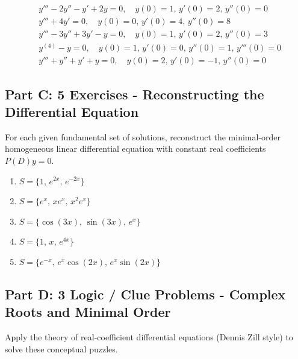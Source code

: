 \documentclass[11pt,letterpaper]{article}
\begin{document}
\begin{align}
    & y''' - 2y'' - y' + 2y = 0, \quad y(0) = 1, \, y'(0) = 2, \, y''(0) = 0 \label{eq:ivp_1} \\
    & y''' + 4y' = 0, \quad y(0) = 0, \, y'(0) = 4, \, y''(0) = 8 \label{eq:ivp_2} \\
    & y''' - 3y'' + 3y' - y = 0, \quad y(0) = 1, \, y'(0) = 2, \, y''(0) = 3 \label{eq:ivp_3} \\
    & y^{(4)} - y = 0, \quad y(0) = 1, \, y'(0) = 0, \, y''(0) = 1, \, y'''(0) = 0 \label{eq:ivp_4} \\
    & y''' + y'' + y' + y = 0, \quad y(0) = 2, \, y'(0) = -1, \, y''(0) = 0 \label{eq:ivp_5}
\end{align}

\subsection*{Part C: 5 Exercises - Reconstructing the Differential Equation}
For each given fundamental set of solutions, reconstruct the minimal-order homogeneous linear differential equation with constant real coefficients $P(D)y = 0$.

\begin{enumerate}[label=\textbf{\arabic*.}]
    \item $S = \{1, \, e^{2x}, \, e^{-2x}\}$
    \item $S = \{e^x, \, x e^x, \, x^2 e^x\}$
    \item $S = \{\cos(3x), \, \sin(3x), \, e^x\}$
    \item $S = \{1, \, x, \, e^{4x}\}$
    \item $S = \{e^{-x}, \, e^x \cos(2x), \, e^x \sin(2x)\}$
\end{enumerate}

\subsection*{Part D: 3 Logic / Clue Problems - Complex Roots and Minimal Order}
Apply the theory of real-coefficient differential equations (Dennis Zill style) to solve these conceptual puzzles.
\end{document}
